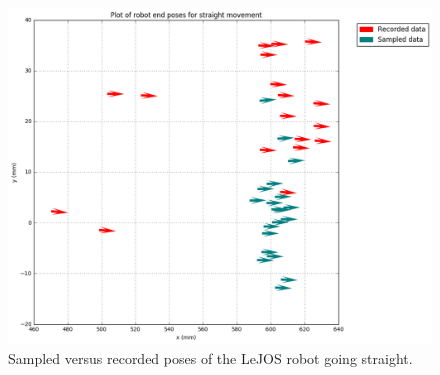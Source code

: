 \documentclass[paper=a4, fontsize=11pt]{scrartcl} %
\begin{document}
    \begin{figure}[H]
        \centering
        \includegraphics[width=1\textwidth]{images/poses_compare_straight.png} %
        \caption{Sampled versus recorded poses of the LeJOS robot going straight.}
    \end{figure}
\end{document}
